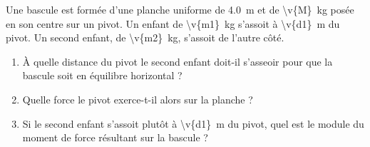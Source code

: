 Une bascule est formée d'une planche uniforme de \qty{4.0}{m} et de \qty{\v{M}}{kg} posée en son centre sur un pivot. Un enfant de \qty{\v{m1}}{kg} s'assoit à \qty{\v{d1}}{m} du pivot. Un second enfant, de \qty{\v{m2}}{kg}, s'assoit de l'autre côté.

\begin{enumerate}[label=\alph*)]
    \item À quelle distance du pivot le second enfant doit-il s'asseoir pour que la bascule soit en équilibre horizontal ?
    \item Quelle force le pivot exerce-t-il alors sur la planche ?
    \item Si le second enfant s'assoit plutôt à \qty{\v{d1}}{m} du pivot, quel est le module du moment de force résultant sur la bascule ?
\end{enumerate}
